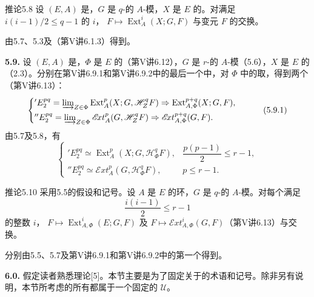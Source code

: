 \begin{SGAresult}{推论}{5.8}
设 $(E,A)$ 是，$G$ 是 $q$-的 $A$-模，$X$ 是 $E$ 的。对满足 $i(i-1)/2\leq q-1$ 的 $i$， $F\mapsto\operatorname{Ext}_A^i(X;G,F)$ 与变元 $F$ 的交换。
\end{SGAresult}
由5.7、5.3及（第V讲6.1.3）得到。

\textbf{5.9.} 设 $(E,A)$ 是，$\Phi$ 是 $E$ 的（第V讲6.12），$G$ 是 $r$-的 $A$-模（5.6），$X$ 是 $E$ 的（2.3）。分别在第V讲6.9.1和第V讲6.9.2中的最后一个中，对 $\Phi$ 中的取，得到两个（第V讲6.13）：
\[
\begin{cases}
{}'E_2^{pq}=\varinjlim_{Z\in\Phi}\operatorname{Ext}_A^p(X;G,\mathscr H_Z^qF)
\Rightarrow\operatorname{Ext}_{A,\Phi}^{p+q}(X;G,F),\\[3pt]
{}''E_2^{pq}=\varinjlim_{Z\in\Phi}\mathscr{E}\!xt_A^p(G,\mathscr H_Z^qF)
\Rightarrow\mathscr{E}\!xt_{A,\Phi}^{p+q}(G,F).
\end{cases}\tag{5.9.1}
\]
由5.7及5.8，有
\[
\begin{cases}
{}'E_2^{pq}\simeq\operatorname{Ext}_A^p(X;G,\mathscr H_\Phi^qF),&\dfrac{p(p-1)}2\leq r-1,\\[5pt]
{}''E_2^{pq}\simeq\mathscr{E}\!xt_A^p(G,\mathscr H_\Phi^qF),&p\leq r-1.
\end{cases}\tag{5.9.2}
\]

\begin{SGAresult}{推论}{5.10}
采用5.5的假设和记号。设 $A$ 是 $E$ 的环，$G$ 是 $q$-的 $A$-模。对每个满足
\[
\frac{i(i-1)}2\leq r-1
\]
的整数 $i$， $F\mapsto\operatorname{Ext}_{A,\Phi}^i(E;G,F)$ 及 $F\mapsto\mathscr{E}\!xt_{A,\Phi}^i(G,F)$（第V讲6.13）与交换。
\end{SGAresult}
分别由5.5、5.7及第V讲6.9.1和第V讲6.9.2中的第一个得到。

\textbf{6.0.} 假定读者熟悉理论[5]。本节主要是为了固定关于的术语和记号。除非另有说明，本节所考虑的所有都属于一个固定的 $\mathcal U$。

